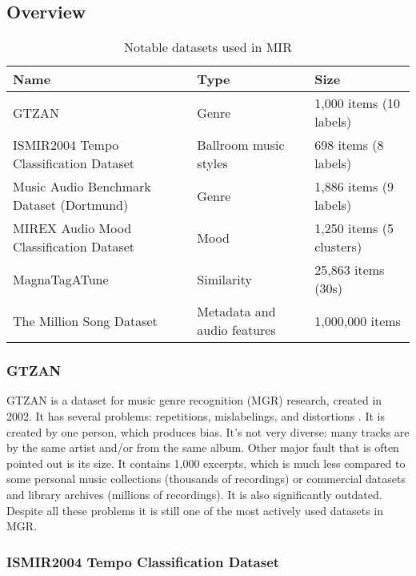 \subsection{Overview}

\begin{table}[h]
    \footnotesize
    \centering
    \begin{tabular}{l|l|l}
        Name & Type & Size \\
        \hline
        GTZAN & Genre & 1,000 items (10 labels) \\
        ISMIR2004 Tempo Classification Dataset & Ballroom music styles & 698 items (8 labels) \\
        Music Audio Benchmark Dataset (Dortmund) & Genre & 1,886 items (9 labels) \\
        MIREX Audio Mood Classification Dataset & Mood & 1,250 items (5 clusters) \\
        MagnaTagATune & Similarity & 25,863 items (30s) \\
        The Million Song Dataset & Metadata and audio features & 1,000,000 items \\
    \end{tabular}
    \caption{Notable datasets used in MIR}
    \label{tab:mirdatasets}
\end{table}

\subsubsection{GTZAN}

GTZAN \cite{tzanetakis2002} is a dataset for music genre recognition (MGR) research, created in 2002. It has several problems: repetitions, mislabelings, and distortions \cite{sturm2013gtzan}. It is created by one person, which produces bias. It's not very diverse: many tracks are by the same artist and/or from the same album. Other major fault that is often pointed out is its size. It contains 1,000 excerpts, which is much less compared to some personal music collections (thousands of recordings) or commercial datasets and library archives (millions of recordings). It is also significantly outdated. Despite all these problems it is still one of the most actively used datasets in MGR.

\subsubsection{ISMIR2004 Tempo Classification Dataset}

